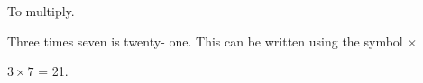 To multiply.  
\par
Three times seven is twenty- one.  This can be written using the symbol  \ensuremath{ \times }   
\par
\ensuremath{3 \times 7} = 21.
